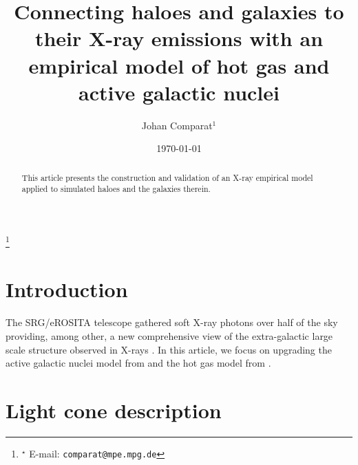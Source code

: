 \documentclass[twocolumn,iop]{openjournal}
\begin{document}

\title{Connecting haloes and galaxies to their X-ray emissions with an empirical model of hot gas and active galactic nuclei} 

\author{Johan Comparat$^{1}$   }


\thanks{$^\star$ E-mail: \nolinkurl{comparat@mpe.mpg.de}}
    
\date{\today}

\begin{abstract}
This article presents the construction and validation of an X-ray empirical model applied to simulated haloes and the galaxies therein. 

\end{abstract}


\maketitle

%
%
%
%
\section{Introduction}
The SRG/eROSITA telescope \citep{PredehlAndritschkeArefiev_2021A&A...647A...1P,SunyaevArefievBabyshkin_2021A&A...656A.132S} gathered soft X-ray photons over half of the sky providing, among other, a new comprehensive view of the extra-galactic large scale structure observed in X-rays \citep[][, C25 hereafter]{ComparatMerloniPonti_2025arXiv250319796C}.  
In this article, we focus on upgrading the active galactic nuclei model from \citet{ComparatMerloniSalvato_2019MNRAS.487.2005C, ComparatLuoMerloni_2023A&A...673A.122C} and the hot gas model from \citet{ComparatEckertFinoguenov_2020OJAp....3E..13C, SeppiComparatBulbul_2022A&A...665A..78S}. 

\section{Light cone description}
\label{sec:light:cone}
\end{document}
